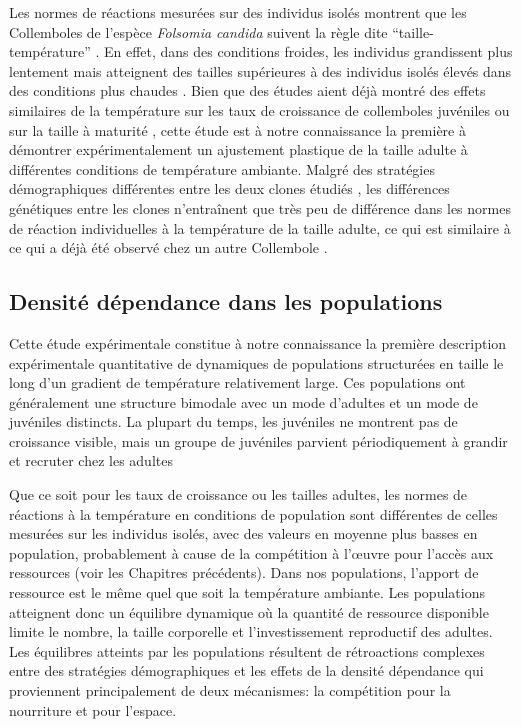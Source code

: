 Les normes de réactions mesurées sur des individus isolés montrent que les
Collemboles de l'espèce \textit{Folsomia candida} suivent la règle dite
``taille-température'' \autocites{atkinson1994a,angilletta2009a}. En effet,
dans des conditions froides, les individus grandissent plus lentement mais
atteignent des tailles supérieures à des individus isolés élevés dans des
conditions plus chaudes \autocites{angilletta2003a}. Bien que des études aient
déjà montré des effets similaires de la température sur les taux de croissance
de collemboles juvéniles \autocites{birkemoe2000a, driessen2007a, ellers2008a,
ellers2011b} ou sur la taille à maturité \autocites{stam1996a}, cette étude est
à notre connaissance la première à démontrer expérimentalement un ajustement
plastique de la taille adulte à différentes conditions de température ambiante.
Malgré des stratégies démographiques différentes entre les deux clones étudiés
\autocites{tully2008a,tully2011a}, les différences génétiques entre les clones
n'entraînent que très peu de différence dans les normes de réaction
individuelles à la température de la taille adulte, ce qui est similaire à ce
qui a déjà été observé chez un autre Collembole \autocites{driessen2007a}.

\subsection{Densité dépendance dans les populations}

Cette étude expérimentale constitue à notre connaissance la première description
expérimentale quantitative de dynamiques de populations structurées en taille le
long d'un gradient de température relativement large. Ces populations ont
généralement une structure bimodale avec un mode d'adultes et un mode de
juvéniles distincts. La plupart du temps, les juvéniles ne montrent pas de
croissance visible, mais un groupe de juvéniles parvient périodiquement à
grandir et recruter chez les adultes 

Que ce soit pour les taux de croissance ou les tailles adultes, les normes de
réactions à la température en conditions de population sont différentes de
celles mesurées sur les individus isolés, avec des valeurs en moyenne plus
basses en population, probablement à cause de la compétition à l'\oe{}uvre pour
l'accès aux ressources (voir les Chapitres précédents). Dans nos populations,
l'apport de ressource est le même quel que soit la température ambiante. Les
populations atteignent donc un équilibre dynamique où la quantité de ressource
disponible limite le nombre, la taille corporelle et l'investissement
reproductif des adultes. Les équilibres atteints par les populations résultent
de rétroactions complexes entre des stratégies démographiques
\autocites[dépendantes des clones,][]{tully2008a,stam1996a} et les effets de la
densité dépendance \autocites{kokko2007a} qui proviennent principalement de deux
mécanismes: la compétition pour la nourriture et pour l'espace. 


